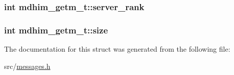 \hypertarget{structmdhim__getm__t_a2fe10e46b27b008657d3c59299ea1fd6}{
\subsubsection[{server\-\_\-rank}]{\setlength{\rightskip}{0pt plus 5cm}int mdhim\-\_\-getm\-\_\-t\-::server\-\_\-rank}}\label{d9/d54/structmdhim__getm__t_a2fe10e46b27b008657d3c59299ea1fd6}
\hypertarget{structmdhim__getm__t_aa6649f87300a3899693521850fa28a17}{
\subsubsection[{size}]{\setlength{\rightskip}{0pt plus 5cm}int mdhim\-\_\-getm\-\_\-t\-::size}}\label{d9/d54/structmdhim__getm__t_aa6649f87300a3899693521850fa28a17}


The documentation for this struct was generated from the following file\-:\begin{DoxyCompactItemize}
\item 
src/\hyperlink{messages_8h}{messages.\-h}\end{DoxyCompactItemize}
